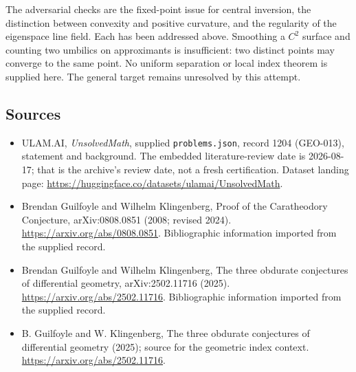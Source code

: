 \documentclass[11pt,a4paper]{article}
\begin{document}
The adversarial checks are the fixed-point issue for central inversion, the distinction between convexity and positive curvature, and the regularity of the eigenspace line field. Each has been addressed above. Smoothing a $C^2$ surface and counting two umbilics on approximants is insufficient: two distinct points may converge to the same point. No uniform separation or local index theorem is supplied here. The general target remains unresolved by this attempt.

\subsection{Sources}

{\small

\begin{itemize}

\item[\hypertarget{source:1204:1}{S1}] ULAM.AI, \emph{UnsolvedMath}, supplied \texttt{problems.json}, record 1204 (GEO-013), statement and background. The embedded literature-review date is 2026-08-17; that is the archive’s review date, not a fresh certification. Dataset landing page: \url{https://huggingface.co/datasets/ulamai/UnsolvedMath}.

\item[\hypertarget{source:1204:2}{S2}] Brendan Guilfoyle and Wilhelm Klingenberg, Proof of the Caratheodory Conjecture, arXiv:0808.0851 (2008; revised 2024). \url{https://arxiv.org/abs/0808.0851}. Bibliographic information imported from the supplied record.

\item[\hypertarget{source:1204:3}{S3}] Brendan Guilfoyle and Wilhelm Klingenberg, The three obdurate conjectures of differential geometry, arXiv:2502.11716 (2025). \url{https://arxiv.org/abs/2502.11716}. Bibliographic information imported from the supplied record.

\item[R1] B. Guilfoyle and W. Klingenberg, The three obdurate conjectures of differential geometry (2025); source for the geometric index context.
\url{https://arxiv.org/abs/2502.11716}.
\end{itemize}

}

\label{end:1204}
\end{document}

